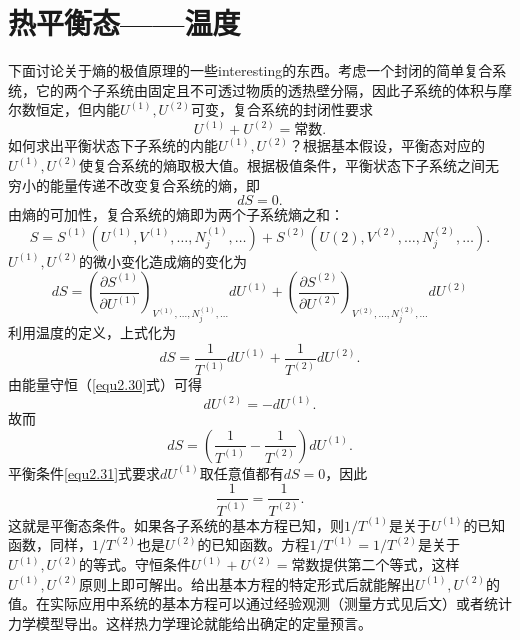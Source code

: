 \section{热平衡态——温度}
\label{sec2.4}
下面讨论关于熵的极值原理的一些interesting的东西。考虑一个封闭的简单复合系统，它的两个子系统由固定且不可透过物质的透热壁分隔，因此子系统的体积与摩尔数恒定，但内能$U^{(1)}, U^{(2)}$可变，复合系统的封闭性要求
\begin{equation}
\label{equ2.30}
	U^{(1)} + U^{(2)} = \text{常数}.
\end{equation}
如何求出平衡状态下子系统的内能$U^{(1)}, U^{(2)}$？根据基本假设，平衡态对应的$U^{(1)}, U^{(2)}$使复合系统的熵取极大值。根据极值条件，平衡状态下子系统之间无穷小的能量传递不改变复合系统的熵，即
\begin{equation}
\label{equ2.31}
	dS = 0.
\end{equation}
由熵的可加性，复合系统的熵即为两个子系统熵之和：
\begin{equation}
\label{equ2.32}
	S = S^{(1)} (U^{(1)}, V^{(1)}, \dots, N_j^{(1)}, \dots) + S^{(2)} (U{(2)}, V^{(2)}, \dots, N_j^{(2)}, \dots).
\end{equation}
$U^{(1)}, U^{(2)}$的微小变化造成熵的变化为
\begin{equation}
\label{equ2.33}
	dS = \left( \frac{\partial S^{(1)} }{\partial U^{(1)} } \right)_{V^{(1)}, \dots, N_j^{(1)}, \dots} dU^{(1)} + \left( \frac{\partial S^{(2)} }{\partial U^{(2)} } \right)_{V^{(2)}, \dots, N_j^{(2)}, \dots} dU^{(2)}
\end{equation}
利用温度的定义，上式化为
\begin{equation}
\label{equ2.34}
	dS = \frac{1}{T^{(1)}} dU^{(1)} + \frac{1}{T^{(2)}} dU^{(2)}.
\end{equation}
由能量守恒（\eqref{equ2.30}式）可得
\begin{equation}
\label{equ2.35}
	dU^{(2)} = -dU^{(1)}.
\end{equation}
故而
\begin{equation}
\label{equ2.36}
	dS = \left( \frac{1}{T^{(1)}} - \frac{1}{T^{(2)}} \right) dU^{(1)}.
\end{equation}
平衡条件\eqref{equ2.31}式要求$dU^{(1)}$取任意值都有$dS = 0$，因此
\begin{equation}
\label{equ2.37}
	\frac{1}{T^{(1)}} = \frac{1}{T^{(2)}}.
\end{equation}
这就是平衡态条件。如果各子系统的基本方程已知，则$1 / T^{(1)}$是关于$U^{(1)}$的已知函数，同样，$1 / T^{(2)}$也是$U^{(2)}$的已知函数。方程$1 / T^{(1)} = 1 / T^{(2)}$是关于$U^{(1)}, U^{(2)}$的等式。守恒条件$U^{(1)} + U^{(2)} = \text{常数}$提供第二个等式，这样$U^{(1)}, U^{(2)}$原则上即可解出。给出基本方程的特定形式后就能解出$U^{(1)}, U^{(2)}$的值。在实际应用中系统的基本方程可以通过经验观测（测量方式见后文）或者统计力学模型导出。这样热力学理论就能给出确定的定量预言。

